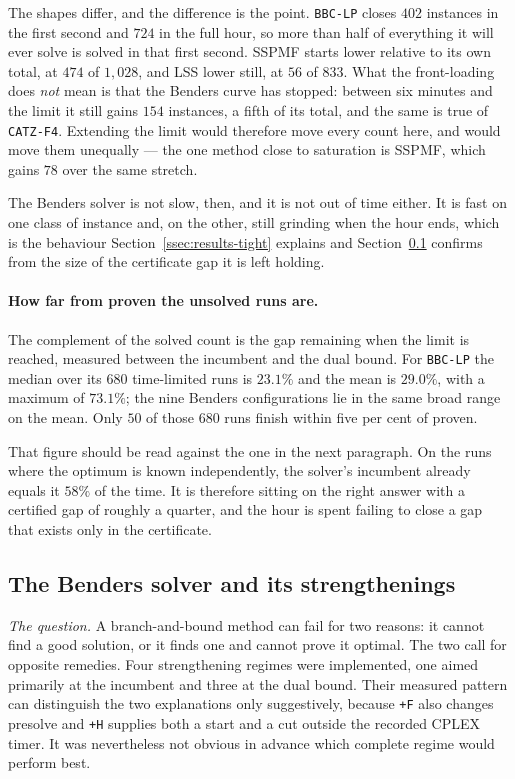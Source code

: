 The shapes differ, and the difference is the point. \texttt{BBC-LP} closes $402$
instances in the first second and $724$ in the full hour, so more than half of
everything it will ever solve is solved in that first second. SSPMF starts lower
relative to its own total, at $474$ of $1{,}028$, and LSS lower still, at $56$ of
$833$. What the front-loading does \emph{not} mean is that the Benders curve has
stopped: between six minutes and the limit it still gains $154$ instances, a fifth of
its total, and the same is true of \texttt{CATZ-F4}. Extending the limit would
therefore move every count here, and would move them unequally --- the one method close
to saturation is SSPMF, which gains $78$ over the same stretch.

The Benders solver is not slow, then, and it is not out of time either. It is fast on
one class of instance and, on the other, still grinding when the hour ends, which is
the behaviour Section~\ref{ssec:results-tight} explains and
Section~\ref{ssec:results-bbc} confirms from the size of the certificate gap it is left
holding.

\paragraph{How far from proven the unsolved runs are.}
The complement of the solved count is the gap remaining when the limit is reached,
measured between the incumbent and the dual bound. For \texttt{BBC-LP} the median over
its $680$ time-limited runs is $23.1\%$ and the mean is $29.0\%$, with a maximum of
$73.1\%$; the nine Benders configurations lie in the same broad range on the mean.
Only $50$ of those $680$ runs finish within five per cent of proven.

That figure should be read against the one in the next paragraph. On the runs where the
optimum is known independently, the solver's incumbent already equals it $58\%$ of the
time. It is therefore sitting on the right answer with a certified gap of roughly a
quarter, and the hour is spent failing to close a gap that exists only in the
certificate.

\subsection{The Benders solver and its strengthenings}\label{ssec:results-bbc}

\emph{The question.} A branch-and-bound method can fail for two reasons: it cannot find
a good solution, or it finds one and cannot prove it optimal. The two call for opposite
remedies. Four strengthening regimes were implemented, one aimed primarily at the
incumbent and three at the dual bound. Their measured pattern can distinguish the two
explanations only suggestively, because \texttt{+F} also changes presolve and
\texttt{+H} supplies both a start and a cut outside the recorded CPLEX timer. It was
nevertheless not obvious in advance which complete regime would perform best.

